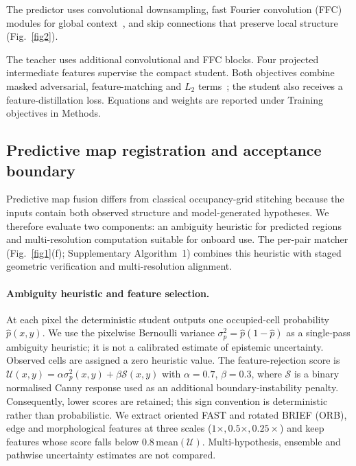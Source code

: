 \documentclass[11pt]{article}
\begin{document}
The predictor uses convolutional downsampling, fast Fourier convolution (FFC) modules for global context~\citep{suvorov2021resolution,chi2020fast}, and skip connections that preserve local structure~\citep{ronneberger2015u} (Fig.~\ref{fig2}).

The teacher uses additional convolutional and FFC blocks. Four projected intermediate features supervise the compact student. Both objectives combine masked adversarial, feature-matching and $L_2$ terms~\citep{suvorov2021resolution,chi2020fast,he2016deep,isola2017image,mescheder2018training}; the student also receives a feature-distillation loss. Equations and weights are reported under Training objectives in Methods.


\subsection{Predictive map registration and acceptance boundary} \label{sec::map fusion}
Predictive map fusion differs from classical occupancy-grid stitching because the inputs contain both observed structure and model-generated hypotheses. We therefore evaluate two components: an ambiguity heuristic for predicted regions and multi-resolution computation suitable for onboard use. The per-pair matcher (Fig.~\ref{fig1}(f); Supplementary Algorithm~1) combines this heuristic with staged geometric verification and multi-resolution alignment.

\paragraph{Ambiguity heuristic and feature selection.}
At each pixel the deterministic student outputs one occupied-cell probability $\hat p(x,y)$. We use the pixelwise Bernoulli variance $\sigma_{p}^{2}=\hat p(1-\hat p)$ as a single-pass ambiguity heuristic; it is not a calibrated estimate of epistemic uncertainty. Observed cells are assigned a zero heuristic value. The feature-rejection score is $\mathcal{U}(x,y)=\alpha\sigma_{p}^{2}(x,y)+\beta\mathcal{S}(x,y)$ with $\alpha{=}0.7$, $\beta{=}0.3$, where $\mathcal{S}$ is a binary normalised Canny response used as an additional boundary-instability penalty. Consequently, lower scores are retained; this sign convention is deterministic rather than probabilistic. We extract oriented FAST and rotated BRIEF (ORB), edge and morphological features at three scales ($1\times,0.5\times,0.25\times$) and keep features whose score falls below $0.8\,\mathrm{mean}(\mathcal{U})$. Multi-hypothesis, ensemble and pathwise uncertainty estimates are not compared.
\end{document}
